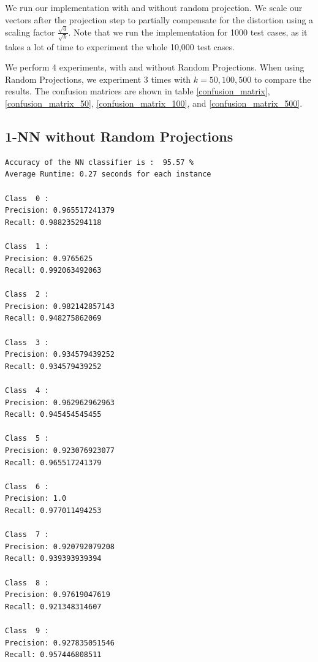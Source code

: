 We run our implementation with and without random projection. We scale our vectors after the projection step to partially compensate for the distortion using a scaling factor $ \frac{\sqrt{d}}{\sqrt{k}} $. Note that we run the implementation for 1000 test cases, as it takes a lot of time to experiment the whole 10,000 test cases. 

We perform 4 experiments, with and without Random Projections. When using Random Projections, we experiment 3 times with $k = {50,100,500}$ to compare the results. The 
confusion matrices are shown in table \ref{confusion_matrix}, \ref{confusion_matrix_50}, \ref{confusion_matrix_100}, and \ref{confusion_matrix_500}.

\subsection*{1-NN without Random Projections}

\begin{lstlisting}[frame=single]
Accuracy of the NN classifier is :  95.57 %
Average Runtime: 0.27 seconds for each instance

Class  0 :
Precision: 0.965517241379
Recall: 0.988235294118

Class  1 :
Precision: 0.9765625
Recall: 0.992063492063

Class  2 :
Precision: 0.982142857143
Recall: 0.948275862069

Class  3 :
Precision: 0.934579439252
Recall: 0.934579439252

Class  4 :
Precision: 0.962962962963
Recall: 0.945454545455

Class  5 :
Precision: 0.923076923077
Recall: 0.965517241379

Class  6 :
Precision: 1.0
Recall: 0.977011494253

Class  7 :
Precision: 0.920792079208
Recall: 0.939393939394

Class  8 :
Precision: 0.97619047619
Recall: 0.921348314607

Class  9 :
Precision: 0.927835051546
Recall: 0.957446808511
\end{lstlisting}

